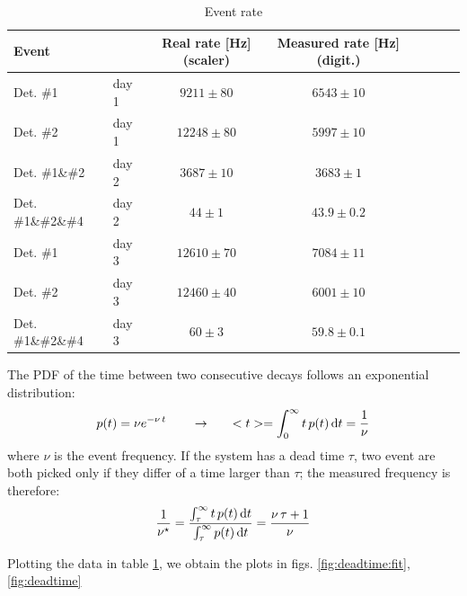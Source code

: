 \documentclass[11pt,a4 paper]{article}
\let\oldfrac\frac
\renewcommand{\frac}[3][d]{\ifthenelse{\equal{#1}{d}}{\oldfrac{#2}{#3}}{\nicefrac{#2}{#3}}}
\begin{document}
\begin{table}[H]
    \centering
    \begin{tabular}{llcccccc}
        \toprule
        Event && Real rate [\si{Hz}] (scaler)& Measured rate [\si{Hz}] (digit.) \\
        \midrule
        Det. \#1 &day 1& $9211 \pm 80$ & $6543 \pm 10$ \\
        Det. \#2 &day 1& $12248 \pm 80$ & $5997 \pm 10$\\
        Det. \#1\&\#2 &day 2& $3687 \pm 10$ & $3683 \pm 1$ \\
        Det. \#1\&\#2\&\#4 &day 2& $44 \pm 1$ & $43.9 \pm 0.2$ \\
        Det. \#1 &day 3& $12610 \pm 70$ & $7084 \pm 11$ \\
        Det. \#2 &day 3& $12460 \pm 40$ & $6001 \pm 10$ \\
        Det. \#1\&\#2\&\#4 &day 3& $60 \pm 3$ & $59.8 \pm 0.1$ \\
        \bottomrule
    \end{tabular}
    \caption{Event rate}
    \label{tab:rate}
\end{table}

The PDF of the time between two consecutive decays follows an exponential distribution:
\begin{equation*}
    p(t) = \nu e^{-\nu \,t} \qquad \rightarrow \qquad <t> = \int_0^{\infty} t\,p(t) \dd{t} = \frac{1}{\nu}
\end{equation*}
where $\nu$ is the event frequency. If the system has a dead time $\tau$, two event are both picked only if they differ of a time larger than $\tau$; the measured frequency is therefore:
\begin{equation*}
    \frac{1}{\nu^\star} = \frac{\int_{\tau}^{\infty} t \,p(t) \dd{t}}{\int_{\tau}^{\infty} p(t) \dd{t}} =\frac{\nu\,\tau + 1}{\nu}
\end{equation*}

Plotting the data in table \ref{tab:rate}, we obtain the plots in figs. \ref{fig:deadtime:fit}, \ref{fig:deadtime}

\end{document}
